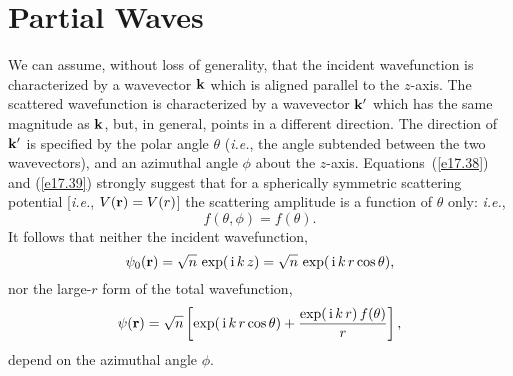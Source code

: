 \section{Partial Waves}
We can assume, without loss of generality, that the incident wavefunction
is characterized by  a wavevector ${\bf k}$ which is aligned parallel to the $z$-axis.
The scattered wavefunction is characterized by a wavevector ${\bf k}'$
which has the same magnitude as ${\bf k}$, but, in general, points
in a different direction. The direction of ${\bf k}'$ is specified
by the polar angle $\theta$ ({\em i.e.}, the angle subtended between the
two wavevectors), and an azimuthal angle $\phi$ about the $z$-axis.
Equations~(\ref{e17.38}) and (\ref{e17.39}) strongly suggest that for a spherically symmetric
scattering potential [{\em i.e.}, $V({\bf r}) = V(r)$] the scattering amplitude
is a function of $\theta$ only: {\em i.e.},
\begin{equation}
f(\theta, \phi) = f(\theta).
\end{equation}
It follows that neither the incident wavefunction,
\begin{equation}\label{e17.52}
\psi_0({\bf r}) = \sqrt{n}\,\exp(\,{\rm i}\,k\,z)= \sqrt{n}\,\exp(\,{\rm i}\,k\,r\cos\theta),
\end{equation}
nor the large-$r$ form of the total wavefunction,
\begin{equation}\label{e17.53}
\psi({\bf r})  = \sqrt{n}
\left[ \exp(\,{\rm i}\,k\,r\cos\theta) + \frac{\exp(\,{\rm i}\,k\,r)\, f(\theta)}
{r} \right],
\end{equation}
depend on the azimuthal angle $\phi$. 

